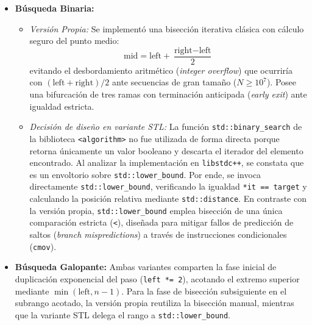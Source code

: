 \documentclass[11pt,letterpaper]{article}
\begin{document}
\begin{itemize}
    \item \textbf{Búsqueda Binaria:} 
    \begin{itemize}
        \item \textit{Versión Propia:} Se implementó una bisección iterativa clásica con cálculo seguro del punto medio:
        \begin{equation}
            \text{mid} = \text{left} + \frac{\text{right} - \text{left}}{2}
        \end{equation}
        evitando el desbordamiento aritmético (\textit{integer overflow}) que ocurriría con $(\text{left} + \text{right})/2$ ante secuencias de gran tamaño ($N \ge 10^7$). Posee una bifurcación de tres ramas con terminación anticipada (\textit{early exit}) ante igualdad estricta.
        \item \textit{Decisión de diseño en variante STL:} La función \texttt{std::binary\_search} de la biblioteca \texttt{<algorithm>} no fue utilizada de forma directa porque retorna únicamente un valor booleano y descarta el iterador del elemento encontrado. Al analizar la implementación en \texttt{libstdc++}, se constata que es un envoltorio sobre \texttt{std::lower\_bound}. Por ende, se invoca directamente \texttt{std::lower\_bound}, verificando la igualdad \texttt{*it == target} y calculando la posición relativa mediante \texttt{std::distance}. En contraste con la versión propia, \texttt{std::lower\_bound} emplea bisección de una única comparación estricta (\texttt{<}), diseñada para mitigar fallos de predicción de saltos (\textit{branch mispredictions}) a través de instrucciones condicionales (\texttt{cmov}).
    \end{itemize}
    \item \textbf{Búsqueda Galopante:} Ambas variantes comparten la fase inicial de duplicación exponencial del paso (\texttt{left *= 2}), acotando el extremo superior mediante $\min(\text{left}, n-1)$. Para la fase de bisección subsiguiente en el subrango acotado, la versión propia reutiliza la bisección manual, mientras que la variante STL delega el rango a \texttt{std::lower\_bound}.
\end{itemize}
\end{document}
